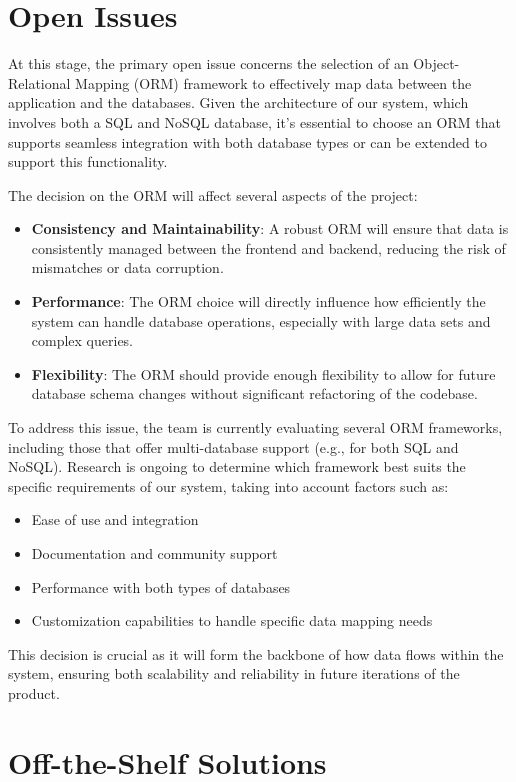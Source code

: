 \documentclass[12pt]{article}
\begin{document}
\section{Open Issues}

At this stage, the primary open issue concerns the selection of an Object-Relational Mapping (ORM) framework to effectively map data between the application and the databases. Given the architecture of our system, which involves both a SQL and NoSQL database, it's essential to choose an ORM that supports seamless integration with both database types or can be extended to support this functionality.

The decision on the ORM will affect several aspects of the project:
\begin{itemize}
    \item \textbf{Consistency and Maintainability}: A robust ORM will ensure that data is consistently managed between the frontend and backend, reducing the risk of mismatches or data corruption.
    \item \textbf{Performance}: The ORM choice will directly influence how efficiently the system can handle database operations, especially with large data sets and complex queries.
    \item \textbf{Flexibility}: The ORM should provide enough flexibility to allow for future database schema changes without significant refactoring of the codebase.
\end{itemize}

To address this issue, the team is currently evaluating several ORM frameworks, including those that offer multi-database support (e.g., for both SQL and NoSQL). Research is ongoing to determine which framework best suits the specific requirements of our system, taking into account factors such as:
\begin{itemize}
    \item Ease of use and integration
    \item Documentation and community support
    \item Performance with both types of databases
    \item Customization capabilities to handle specific data mapping needs
\end{itemize}

This decision is crucial as it will form the backbone of how data flows within the system, ensuring both scalability and reliability in future iterations of the product.

\section{Off-the-Shelf Solutions}
\end{document}
